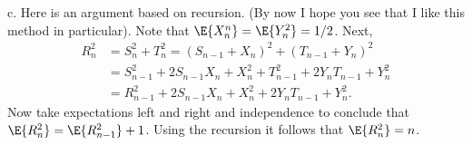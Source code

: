 \begin{exercise}
\begin{solution}
c. Here is an argument based on recursion. (By now I hope you see that I like this method in particular). Note that $\E{X_n^n} = \E{Y_n^2} = 1/2$. Next,
\begin{align*}
  R_n^2 &= S_n^2 + T_n^{2} = (S_{n-1} + X_{n})^{2} + (T_{n-1} + Y_n)^{2} \\
  &= S_{n-1}^2 + 2S_{n-1}X_n + X_n^{2} + T_{n-1}^2 + 2Y_nT_{n-1} + Y_n^{2} \\
  &= R_{n-1}^2 + 2S_{n-1}X_n + X_n^{2} + 2Y_nT_{n-1} + Y_n^{2}.
\end{align*}
Now take expectations left and right and independence to conclude that $\E{R_n^{2}} = \E{R_{n-1}^{2}} + 1$. Using the recursion it follows that $\E{R^2_n} = n$.
\end{solution}
\end{exercise}

